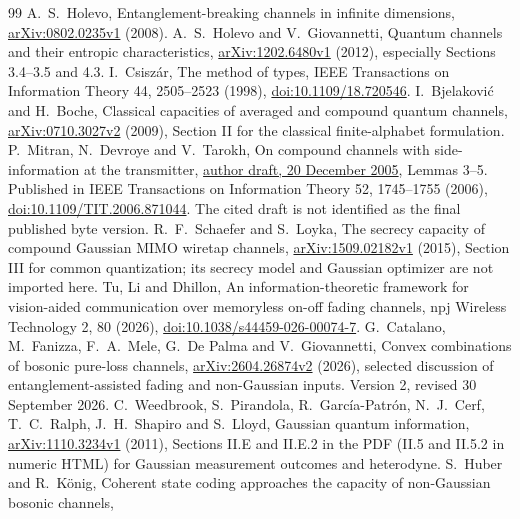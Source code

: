 \documentclass[11pt]{article}
\begin{document}
\begin{thebibliography}{99}
 A.~S.~Holevo, Entanglement-breaking channels in infinite
dimensions, \href{https://arxiv.org/abs/0802.0235v1}{arXiv:0802.0235v1} (2008).
 A.~S.~Holevo and V.~Giovannetti, Quantum channels
and their entropic characteristics,
\href{https://arxiv.org/abs/1202.6480v1}{arXiv:1202.6480v1} (2012),
especially Sections 3.4--3.5 and 4.3.
 I.~Csisz\'ar, The method of types, IEEE Transactions on
Information Theory 44, 2505--2523 (1998),
\href{https://doi.org/10.1109/18.720546}{doi:10.1109/18.720546}.
 I.~Bjelakovi\'c and H.~Boche, Classical capacities of
averaged and compound quantum channels,
\href{https://arxiv.org/abs/0710.3027v2}{arXiv:0710.3027v2} (2009),
Section II for the classical finite-alphabet formulation.
 P.~Mitran, N.~Devroye and V.~Tarokh, On compound
channels with side-information at the transmitter,
\href{https://ece.uwaterloo.ca/~pmitran/compound3.pdf}{author draft,
20 December 2005}, Lemmas 3--5. Published in IEEE Transactions on
Information Theory 52, 1745--1755 (2006),
\href{https://doi.org/10.1109/TIT.2006.871044}{doi:10.1109/TIT.2006.871044}.
The cited draft is not identified as the final published byte version.
 R.~F.~Schaefer and S.~Loyka, The secrecy capacity
of compound Gaussian MIMO wiretap channels,
\href{https://arxiv.org/abs/1509.02182v1}{arXiv:1509.02182v1} (2015),
Section III for common quantization; its secrecy model and Gaussian
optimizer are not imported here.
 Tu, Li and Dhillon, An information-theoretic framework for
vision-aided communication over memoryless on-off fading channels,
npj Wireless Technology 2, 80 (2026),
\href{https://doi.org/10.1038/s44459-026-00074-7}
{doi:10.1038/s44459-026-00074-7}.
 G.~Catalano, M.~Fanizza, F.~A.~Mele,
G.~De Palma and V.~Giovannetti, Convex combinations of bosonic
pure-loss channels,
\href{https://arxiv.org/abs/2604.26874v2}{arXiv:2604.26874v2} (2026),
selected discussion of entanglement-assisted fading and non-Gaussian
inputs. Version 2, revised 30 September 2026.
 C.~Weedbrook, S.~Pirandola,
R.~Garc\'ia-Patr\'on, N.~J.~Cerf, T.~C.~Ralph, J.~H.~Shapiro
and S.~Lloyd, Gaussian quantum information,
\href{https://arxiv.org/abs/1110.3234v1}{arXiv:1110.3234v1} (2011),
Sections II.E and II.E.2 in the PDF (II.5 and II.5.2 in numeric HTML)
for Gaussian measurement outcomes and heterodyne.
 S.~Huber and R.~K\"onig, Coherent state coding approaches
the capacity of non-Gaussian bosonic channels,

\end{thebibliography}
\end{document}
